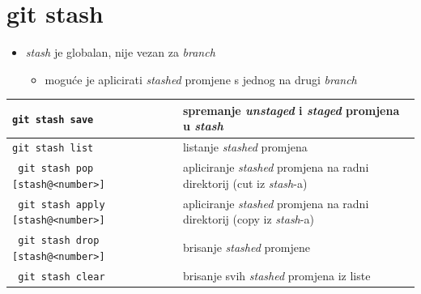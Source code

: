 \documentclass[10pt]{article}
\begin{document}
    \section*{\color{BrickRed} git stash}
    \begin{itemize}
        \item \textit{stash} je globalan, nije vezan za \textit{branch}
        \begin{itemize}
            \item moguće je aplicirati \textit{stashed} promjene s jednog na drugi \textit{branch}
        \end{itemize}
    \end{itemize}
    \begin{tabular}{|>{\tt}p{9.25cm}|>{}p{15.50cm}|}
        \hline
        git stash save                                  & spremanje \textit{unstaged} i \textit{staged} promjena u \textit{stash} \\ \hline
        git stash list                                  & listanje \textit{stashed} promjena \\ \hline
        git stash pop [stash@{<number>}]                & apliciranje \textit{stashed} promjena na radni direktorij (cut iz \textit{stash}-a) \\ \hline
        git stash apply [stash@{<number>}]              & apliciranje \textit{stashed} promjena na radni direktorij (copy iz \textit{stash}-a) \\ \hline
        git stash drop [stash@{<number>}]               & brisanje \textit{stashed} promjene \\ \hline
        git stash clear                                 & brisanje svih \textit{stashed} promjena iz liste \\ \hline
    \end{tabular}
\end{document}
